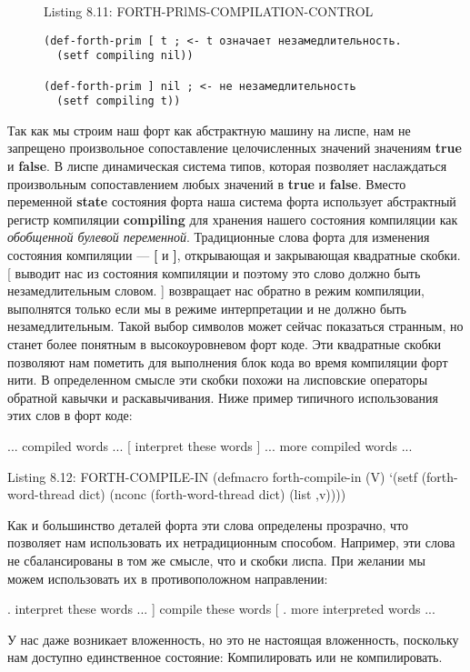 \begin{figure}Listing 8.11: FORTH-PRlMS-COMPILATION-CONTROL\label{listing_8.11}
\listbegin
\begin{verbatim}
(def-forth-prim [ t ; <- t означает незамедлительность.
  (setf compiling nil))

(def-forth-prim ] nil ; <- не незамедлительность
  (setf compiling t))
\end{verbatim}
\listend
\end{figure}


Так как мы строим наш форт как абстрактную машину на лиспе, нам не запрещено произвольное сопоставление целочисленных значений значениям \textbf{true} и \textbf{false}. В лиспе динамическая система типов, которая позволяет наслаждаться произвольным сопоставлением любых значений в \textbf{true} и \textbf{false}. Вместо переменной \textbf{state} состояния форта наша система форта использует абстрактный регистр компиляции \textbf{compiling} для хранения нашего состояния компиляции как \emph{обобщенной булевой переменной}. Традиционные слова форта для изменения состояния компиляции --- \textbf{[} и \textbf{]}, открывающая и закрывающая квадратные скобки. [ выводит нас из состояния компиляции и поэтому это слово должно быть незамедлительным словом. ] возвращает нас обратно в режим компиляции, выполнятся только если мы в режиме интерпретации и не должно быть незамедлительным. Такой выбор символов может сейчас показаться странным, но станет более понятным в высокоуровневом форт коде. Эти квадратные скобки позволяют нам пометить для выполнения блок кода во время компиляции форт нити. В определенном смысле эти скобки похожи на лисповские операторы обратной кавычки и раскавычивания. Ниже пример типичного использования этих слов в форт коде:

... compiled words ...
[ interpret these words ]
... more compiled words ...

Listing 8.12: FORTH-COMPILE-IN
(defmacro forth-compile-in (V)
‘(setf (forth-word-thread dict)
(nconc (forth-word-thread dict)
(list ,v))))

Как и большинство деталей форта эти слова определены прозрачно, что позволяет нам использовать их нетрадиционным способом. Например, эти слова не сбалансированы в том же смысле, что и скобки лиспа. При желании мы можем использовать их в противоположном направлении:

. interpret these words ...
] compile these words [
. more interpreted words ...

У нас даже возникает вложенность, но это не настоящая вложенность, поскольку нам доступно единственное состояние: Компилировать или не компилировать.

